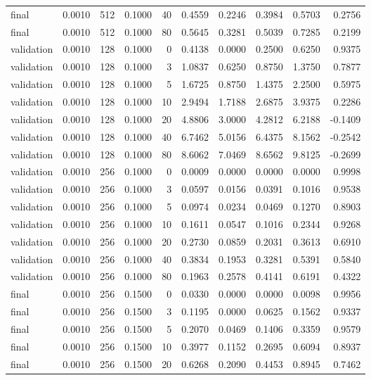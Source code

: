 \begin{tabular}{lrrrrrrrrr}
final & 0.0010 & 512 & 0.1000 & 40 & 0.4559 & 0.2246 & 0.3984 & 0.5703 & 0.2756 \\
final & 0.0010 & 512 & 0.1000 & 80 & 0.5645 & 0.3281 & 0.5039 & 0.7285 & 0.2199 \\
validation & 0.0010 & 128 & 0.1000 & 0 & 0.4138 & 0.0000 & 0.2500 & 0.6250 & 0.9375 \\
validation & 0.0010 & 128 & 0.1000 & 3 & 1.0837 & 0.6250 & 0.8750 & 1.3750 & 0.7877 \\
validation & 0.0010 & 128 & 0.1000 & 5 & 1.6725 & 0.8750 & 1.4375 & 2.2500 & 0.5975 \\
validation & 0.0010 & 128 & 0.1000 & 10 & 2.9494 & 1.7188 & 2.6875 & 3.9375 & 0.2286 \\
validation & 0.0010 & 128 & 0.1000 & 20 & 4.8806 & 3.0000 & 4.2812 & 6.2188 & -0.1409 \\
validation & 0.0010 & 128 & 0.1000 & 40 & 6.7462 & 5.0156 & 6.4375 & 8.1562 & -0.2542 \\
validation & 0.0010 & 128 & 0.1000 & 80 & 8.6062 & 7.0469 & 8.6562 & 9.8125 & -0.2699 \\
validation & 0.0010 & 256 & 0.1000 & 0 & 0.0009 & 0.0000 & 0.0000 & 0.0000 & 0.9998 \\
validation & 0.0010 & 256 & 0.1000 & 3 & 0.0597 & 0.0156 & 0.0391 & 0.1016 & 0.9538 \\
validation & 0.0010 & 256 & 0.1000 & 5 & 0.0974 & 0.0234 & 0.0469 & 0.1270 & 0.8903 \\
validation & 0.0010 & 256 & 0.1000 & 10 & 0.1611 & 0.0547 & 0.1016 & 0.2344 & 0.9268 \\
validation & 0.0010 & 256 & 0.1000 & 20 & 0.2730 & 0.0859 & 0.2031 & 0.3613 & 0.6910 \\
validation & 0.0010 & 256 & 0.1000 & 40 & 0.3834 & 0.1953 & 0.3281 & 0.5391 & 0.5840 \\
validation & 0.0010 & 256 & 0.1000 & 80 & 0.1963 & 0.2578 & 0.4141 & 0.6191 & 0.4322 \\
final & 0.0010 & 256 & 0.1500 & 0 & 0.0330 & 0.0000 & 0.0000 & 0.0098 & 0.9956 \\
final & 0.0010 & 256 & 0.1500 & 3 & 0.1195 & 0.0000 & 0.0625 & 0.1562 & 0.9337 \\
final & 0.0010 & 256 & 0.1500 & 5 & 0.2070 & 0.0469 & 0.1406 & 0.3359 & 0.9579 \\
final & 0.0010 & 256 & 0.1500 & 10 & 0.3977 & 0.1152 & 0.2695 & 0.6094 & 0.8937 \\
final & 0.0010 & 256 & 0.1500 & 20 & 0.6268 & 0.2090 & 0.4453 & 0.8945 & 0.7462 \\

\end{tabular}
